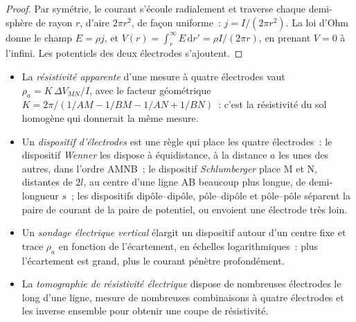 \begin{proof}
Par symétrie, le courant s'écoule radialement et traverse chaque demi-sphère de
rayon $r$, d'aire $2\pi r^2$, de façon uniforme~: $j = I/(2\pi r^2)$. La loi
d'Ohm donne le champ $E = \rho j$, et $V(r) = \int_r^\infty E\,\mathrm{d}r'
= \rho I/(2\pi r)$, en prenant $V = 0$ à l'infini. Les potentiels des deux
électrodes s'ajoutent.
\end{proof}

\begin{definition}\label{def:b3:field-lab-methods-3:resistivity}
\leavevmode
\begin{itemize}
  \item La \emph{résistivité apparente} d'une
        mesure à quatre électrodes vaut $\rho_a = K\,\Delta V_{MN}/I$, avec
        le facteur géométrique $K = 2\pi/(1/AM - 1/BM - 1/AN + 1/BN)$~: c'est
        la résistivité du sol homogène qui donnerait la même
        mesure.
  \item Un \emph{dispositif d'électrodes} est une règle qui
        place les quatre électrodes~: le dispositif \emph{Wenner} les dispose
        à équidistance, à la distance $a$ les unes des autres, dans l'ordre AMNB~;
        le dispositif \emph{Schlumberger} place M et N, distantes de $2l$, au
        centre d'une ligne AB beaucoup plus longue, de demi-longueur $s$~;
        les dispositifs dipôle--dipôle, pôle--dipôle et pôle--pôle séparent la paire
        de courant de la paire de potentiel, ou envoient une électrode très loin.
  \item Un \emph{sondage électrique vertical}
        élargit un dispositif autour d'un centre fixe et trace
        $\rho_a$ en fonction de l'écartement, en échelles logarithmiques~: plus
        l'écartement est grand, plus le courant pénètre profondément.
  \item La \emph{tomographie de résistivité électrique}
        dispose de nombreuses électrodes le long d'une ligne,
        mesure de nombreuses combinaisons à quatre électrodes et les inverse
        ensemble pour obtenir une coupe de résistivité.
\end{itemize}
\end{definition}

